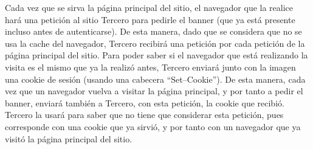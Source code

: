 Cada vez que se sirva la página principal del sitio, el navegador que la realice hará una petición al sitio Tercero para pedirle el banner (que ya está presente incluso antes de autenticarse). De esta manera, dado que se considera que no se usa la cache del navegador, Tercero recibirá una petición por cada petición de la página principal del sitio. Para poder saber si el navegador que está realizando la visita es el mismo que ya la realizó antes, Tercero enviará junto con la imagen una cookie de sesión (usando una cabecera ``Set--Cookie''). De esta manera, cada vez que un navegador vuelva a visitar la página principal, y por tanto a pedir el banner, enviará también a Tercero, con esta petición, la cookie que recibió. Tercero la usará para saber que no tiene que considerar esta petición, pues corresponde con una cookie que ya sirvió, y por tanto con un navegador que ya visitó la página principal del sitio.

